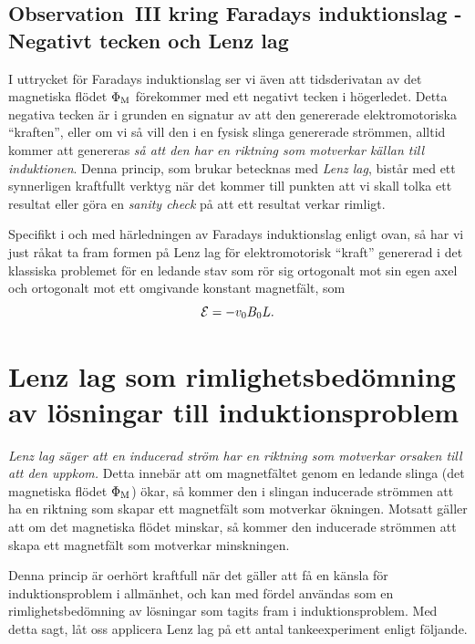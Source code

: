 {{{{\subsection{Observation~III kring Faradays induktionslag
  - Negativt tecken och Lenz lag}
I uttrycket f{\"o}r Faradays induktionslag ser vi {\"a}ven att tidsderivatan av
det magnetiska fl{\"o}det $\Phi_{\rm M}$ f{\"o}rekommer med ett negativt tecken i
h{\"o}gerledet. Detta negativa tecken {\"a}r i grunden en signatur av att den
genererade elektromotoriska ``kraften'', eller om vi s{\aa} vill den i en fysisk
slinga genererade str{\"o}mmen, alltid kommer att genereras {\it s{\aa} att den
har en riktning som motverkar k{\"a}llan till induktionen}.
Denna princip, som brukar betecknas med {\it Lenz lag}, bist{\aa}r med ett
synnerligen kraftfullt verktyg n{\"a}r det kommer till punkten att vi skall
tolka ett resultat eller g{\"o}ra en {\it sanity check} p{\aa} att ett resultat
verkar rimligt.

Specifikt i och med h{\"a}rledningen av Faradays induktionslag enligt ovan,
s{\aa} har vi just r{\aa}kat ta fram formen p{\aa} Lenz lag f{\"o}r
elektromotorisk ``kraft'' genererad i det klassiska problemet f{\"o}r en
ledande stav som r{\"o}r sig ortogonalt mot sin egen axel och ortogonalt mot
ett omgivande konstant magnetf{\"a}lt, som
$$
  {\cal E}=-v_0 B_0 L.
$$
\vfill\eject

\section{Lenz lag som rimlighetsbed{\"o}mning av l{\"o}sningar till
  induktionsproblem}
{\it Lenz lag s{\"a}ger att en inducerad str{\"o}m har en riktning som
motverkar orsaken till att den uppkom.} Detta inneb{\"a}r att om
magnetf{\"a}ltet genom en ledande slinga (det magnetiska fl{\"o}det
$\Phi_{\rm M}$) {\"o}kar, s{\aa} kommer den i slingan inducerade str{\"o}mmen
att ha en riktning som skapar ett magnetf{\"a}lt som motverkar {\"o}kningen.
Motsatt g{\"a}ller att om det magnetiska fl{\"o}det minskar, s{\aa} kommer den
inducerade str{\"o}mmen att skapa ett magnetf{\"a}lt som motverkar minskningen.

Denna princip {\"a}r oerh{\"o}rt kraftfull n{\"a}r det g{\"a}ller att f{\aa}
en k{\"a}nsla f{\"o}r induktionsproblem i allm{\"a}nhet, och kan med f{\"o}rdel
anv{\"a}ndas som en rimlighetsbed{\"o}mning av l{\"o}sningar som tagits fram i
induktionsproblem. Med detta sagt, l{\aa}t oss applicera Lenz lag p{\aa} ett
antal tankeexperiment enligt f{\"o}ljande.
\noindent
\vfill\eject

}}}}
